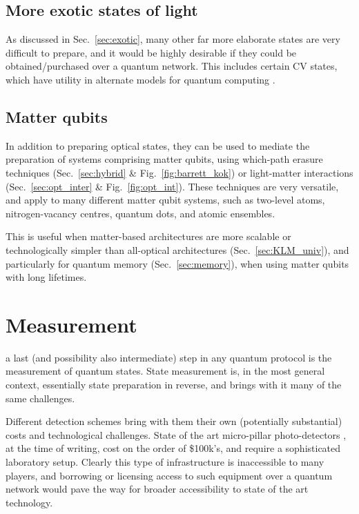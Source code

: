%
%

\subsection{More exotic states of light}

As discussed in Sec.~\ref{sec:exotic}, many other far more elaborate states are very difficult to prepare, and it would be highly desirable if they could be obtained/purchased over a quantum network. This includes certain CV states, which have utility in alternate models for quantum computing \cite{bib:Menicucci06, Ralph, Lund}.



%
%

\subsection{Matter qubits} 

In addition to preparing optical states, they can be used to mediate the preparation of systems comprising matter qubits, using which-path erasure techniques (Sec.~\ref{sec:hybrid} \& Fig.~\ref{fig:barrett_kok}) or light-matter interactions (Sec.~\ref{sec:opt_inter} \& Fig.~\ref{fig:opt_int}). These techniques are very versatile, and apply to many different matter qubit systems, such as two-level atoms, nitrogen-vacancy centres, quantum dots, and atomic ensembles.

This is useful when matter-based architectures are more scalable or technologically simpler than all-optical architectures (Sec.~\ref{sec:KLM_univ}), and particularly for quantum memory (Sec.~\ref{sec:memory}), when using matter qubits with long lifetimes.

%
%

\section{Measurement} 

 a last (and possibility also intermediate) step in any quantum protocol is the measurement of quantum states. State measurement is, in the most general context, essentially state preparation in reverse, and brings with it many of the same challenges.

Different detection schemes bring with them their own (potentially substantial) costs and technological challenges. State of the art micro-pillar photo-detectors \cite{???}, at the time of writing, cost on the order of \$100k's, and require a sophisticated laboratory setup. Clearly this type of infrastructure is inaccessible to many players, and borrowing or licensing access to such equipment over a quantum network would pave the way for broader accessibility to state of the art technology.

